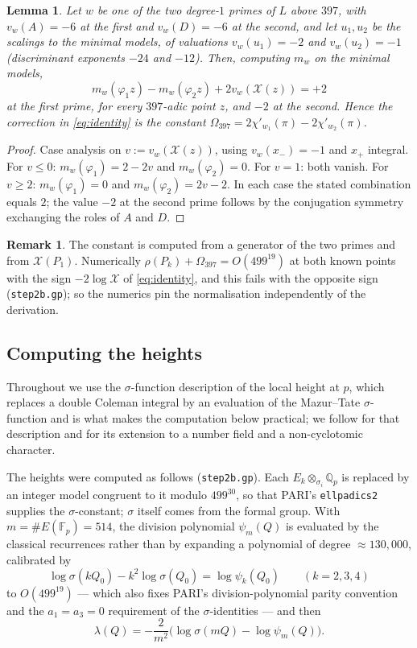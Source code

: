 \documentclass[11pt,reqno]{amsart}
\theoremstyle{plain}
\newtheorem{lemma}[theorem]{Lemma}
\theoremstyle{definition}
\newtheorem{remark}[theorem]{Remark}
\newcommand{\Q}{\mathbb{Q}}
\newcommand{\FF}{\mathbb{F}}
\numberwithin{equation}{section}
\begin{document}
\begin{lemma}\label{lem:397}
Let $w$ be one of the two degree-$1$ primes of $L$ above $397$, with
$v_{w}(A)=-6$ at the first and $v_{w}(D)=-6$ at the second, and let $u_{1},u_{2}$
be the scalings to the minimal models, of valuations $v_{w}(u_{1})=-2$ and
$v_{w}(u_{2})=-1$ (discriminant exponents $-24$ and $-12$). Then, computing
$m_{w}$ on the minimal models,
\[
  m_{w}(\varphi_{1}z)-m_{w}(\varphi_{2}z)+2v_{w}(\mathcal{X}(z))=+2
\]
at the first prime, for every $397$-adic point $z$, and $-2$ at the second.
Hence the correction in \eqref{eq:identity} is the constant
$\Omega_{397}=2\chi'_{w_{1}}(\pi)-2\chi'_{w_{2}}(\pi)$.
\end{lemma}

\begin{proof}
Case analysis on $v:=v_{w}(\mathcal{X}(z))$, using $v_{w}(x_{-})=-1$ and
$x_{+}$ integral. For $v\le0$: $m_{w}(\varphi_{1})=2-2v$ and
$m_{w}(\varphi_{2})=0$. For $v=1$: both vanish. For $v\ge2$:
$m_{w}(\varphi_{1})=0$ and $m_{w}(\varphi_{2})=2v-2$. In each case the stated
combination equals $2$; the value $-2$ at the second prime follows by the
conjugation symmetry exchanging the roles of $A$ and $D$.
\end{proof}

\begin{remark}
The constant is computed from a generator of the two primes and from
$\mathcal{X}(P_{1})$. Numerically $\rho(P_{k})+\Omega_{397}=O(499^{19})$ at both
known points with the sign $-2\log\mathcal{X}$ of \eqref{eq:identity}, and this
fails with the opposite sign (\texttt{step2b.gp}); so the numerics pin the
normalisation independently of the derivation.
\end{remark}

\subsection{Computing the heights}

Throughout we use the $\sigma$-function description of the local height at $p$,
which replaces a double Coleman integral by an evaluation of the Mazur--Tate
$\sigma$-function \cite{MazurTate} and is what makes the computation below
practical; we follow \cite{Bianchi} for that description and \cite{BBBM} for its
extension to a number field and a non-cyclotomic character.

The heights were computed as follows (\texttt{step2b.gp}). Each
$E_{k}\otimes_{\sigma_{i}}\Q_{p}$ is replaced by an integer model congruent to it
modulo $499^{30}$, so that PARI's \texttt{ellpadics2} supplies the $\sigma$-constant;
$\sigma$ itself comes from the formal group. With $m=\#E(\FF_{p})=514$, the
division polynomial $\psi_{m}(Q)$ is evaluated by the classical recurrences
rather than by expanding a polynomial of degree ${\approx}130{,}000$, calibrated
by
\[
  \log\sigma(kQ_{0})-k^{2}\log\sigma(Q_{0})=\log\psi_{k}(Q_{0})
  \qquad (k=2,3,4)
\]
to $O(499^{19})$ --- which also fixes PARI's division-polynomial parity
convention and the $a_{1}=a_{3}=0$ requirement of the $\sigma$-identities ---
and then
\[
  \lambda(Q)=-\frac{2}{m^{2}}\bigl(\log\sigma(mQ)-\log\psi_{m}(Q)\bigr).
\]
\end{document}
